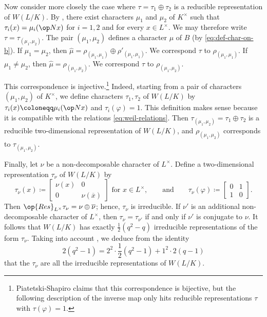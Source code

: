 \documentclass[../main.tex]{subfiles}
\begin{document}
Now consider more closely the case where $\tau=\tau_1\oplus\tau_2$ is a reducible representation of $W(L/K)$. By , there exist characters $\mu_1$ and $\mu_2$ of $K^\times$ such that $\tau_i(x)=\mu_i(\op Nx)$ for $i=1,2$ and for every $x\in L^\times$. We may therefore write $\tau=\tau_{(\mu_1,\mu_2)}$. The pair $(\mu_1,\mu_2)$ defines a character $\mu$ of $B$ (by \eqref{eq:def-char-on-b}). If $\mu_1=\mu_2$, then $\widehat\mu=\rho_{(\mu_1,\mu_1)}\oplus\rho'_{(\mu_1,\mu_1)}$. We correspond $\tau$ to $\rho_{(\mu_1,\mu_1)}$. If $\mu_1\ne\mu_2$, then $\widehat\mu=\rho_{(\mu_1,\mu_2)}$. We correspond $\tau$ to $\rho_{(\mu_1,\mu_2)}$.

This correspondence is injective.\footnote{Piatetski-Shapiro claims that this correspondence is bijective, but the following description of the inverse map only hits reducible representations $\tau$ with $\tau(\varphi)=1$.} Indeed, starting from a pair of characters $(\mu_1,\mu_2)$ of $K^\times$, we define characters $\tau_1,\tau_2$ of $W(L/K)$ by $\tau_i(x)\coloneqq\mu_i(\op Nx)$ and $\tau_i(\varphi)=1$. This definition makes sense because it is compatible with the relations \eqref{eq:weil-relations}. Then $\tau_{(\mu_1,\mu_2)}=\tau_1\oplus\tau_2$ is a reducible two-dimensional representation of $W(L/K)$, and $\rho_{(\mu_1,\mu_2)}$ corresponds to $\tau_{(\mu_1,\mu_2)}$.

Finally, let $\nu$ be a non-decomposable character of $L^\times$. Define a two-dimensional representation $\tau_\nu$ of $W(L/K)$ by
\[\tau_\nu(x)\coloneqq\begin{bmatrix}
	\nu(x) & 0 \\
	0 & \nu(\overline x)
\end{bmatrix}\text{ for }x\in L^\times,\qquad\text{and}\qquad\tau_\nu(\varphi)\coloneqq\begin{bmatrix}
	0 & 1 \\
	1 & 0
\end{bmatrix}.\]
Then $\op{Res}_{L^\times}\tau_\nu=\nu\oplus\overline\nu$; hence, $\tau_\nu$ is irreducible. If $\nu'$ is an additional non-decomposable character of $L^\times$, then $\tau_\nu=\tau_{\nu'}$ if and only if $\nu'$ is conjugate to $\nu$. It follows that $W(L/K)$ has exactly $\frac12\left(q^2-q\right)$ irreducible representations of the form $\tau_\nu$. Taking into account , we deduce from the identity
\[2\left(q^2-1\right)=2^2\cdot\frac12\left(q^2-1\right)+1^2\cdot2(q-1)\]
that the $\tau_\nu$ are all the irreducible representations of $W(L/K)$.
\end{document}
